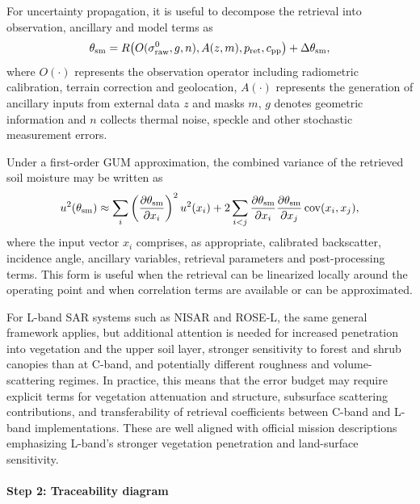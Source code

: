 \noindent For uncertainty propagation, it is useful to decompose the retrieval into
observation, ancillary and model terms as
\begin{equation}
  \theta_{\rm sm} = R\bigl(O(\sigma^0_{\rm raw}, g, n), A(z, m), p_{\rm ret}, c_{\rm pp}\bigr)
  + \Delta\theta_{\rm sm},
  \label{eq:sm_decomposition}
\end{equation}
where $O(\cdot)$ represents the observation operator including radiometric
calibration, terrain correction and geolocation, $A(\cdot)$ represents the
generation of ancillary inputs from external data $z$ and masks $m$, $g$
denotes geometric information and $n$ collects thermal noise, speckle and other
stochastic measurement errors.

\noindent Under a first-order GUM approximation, the combined variance of the
retrieved soil moisture may be written as
\begin{equation}
  u^2(\theta_{\rm sm}) \approx \sum_i \left(\frac{\partial \theta_{\rm sm}}{\partial x_i}\right)^2 u^2(x_i)
  + 2\sum_{i<j} \frac{\partial \theta_{\rm sm}}{\partial x_i}\frac{\partial \theta_{\rm sm}}{\partial x_j}\,\mathrm{cov}(x_i,x_j),
  \label{eq:sm_gum_propagation}
\end{equation}
where the input vector $x_i$ comprises, as appropriate, calibrated backscatter,
incidence angle, ancillary variables, retrieval parameters and post-processing
terms. This form is useful when the retrieval can be linearized locally around
the operating point and when correlation terms are available or can be
approximated.

\noindent For \mbox{L-band} \ac{SAR} systems such as NISAR and ROSE-L, the same
general framework applies, but additional attention is needed for increased
penetration into vegetation and the upper soil layer, stronger sensitivity to
forest and shrub canopies than at \mbox{C-band}, and potentially different
roughness and volume-scattering regimes. In practice, this means that the error
budget may require explicit terms for vegetation attenuation and structure,
subsurface scattering contributions, and transferability of retrieval
coefficients between \mbox{C-band} and \mbox{L-band} implementations. These are
well aligned with official mission descriptions emphasizing \mbox{L-band}'s
stronger vegetation penetration and land-surface sensitivity.

\paragraph{Step 2: Traceability diagram}

